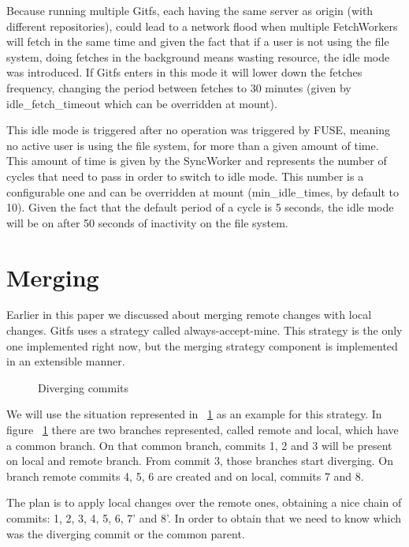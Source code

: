 Because running multiple Gitfs, each having the same server as origin (with different repositories), could lead to a network flood when multiple FetchWorkers will fetch in the same time and given the fact that if a user is not using the file system, doing fetches in the background means wasting resource, the idle mode was introduced. If Gitfs enters in this mode it will lower down the fetches frequency, changing the period between fetches to 30 minutes (given by idle\_fetch\_timeout which can be overridden at mount).

This idle mode is triggered after no operation was triggered by FUSE, meaning no active user is using the file system, for more than a given amount of time. This amount of time is given by the SyncWorker and represents the number of cycles that need to pass in order to switch to idle mode. This number is a configurable one and can be overridden at mount (min\_idle\_times, by default to 10). Given the fact that the default period of a cycle is 5 seconds, the idle mode will be on after 50 seconds of inactivity on the file system.

\section{Merging}

Earlier in this paper we discussed about merging remote changes with local changes. Gitfs uses a strategy called always-accept-mine. This strategy is the only one implemented right now, but the merging strategy component is implemented in an extensible manner.

\begin{figure}[h]
  \begin{center}
    \def\svgwidth{\columnwidth}
    
  \end{center}
  \caption{Diverging commits}
  \label{fig:commits}
\end{figure}

We will use the situation represented in ~\ref{fig:commits} as an example for this strategy. In figure ~\ref{fig:commits} there are two branches represented, called remote and local, which have a common branch. On that common branch, commits 1, 2 and 3 will be present on local and remote branch. From commit 3, those branches start diverging. On branch remote commits 4, 5, 6 are created and on local, commits 7 and 8.

The plan is to apply local changes over the remote ones, obtaining a nice chain of commits: 1, 2, 3, 4, 5, 6, 7' and 8'. In order to obtain that we need to know which was the diverging commit or the common parent. 

